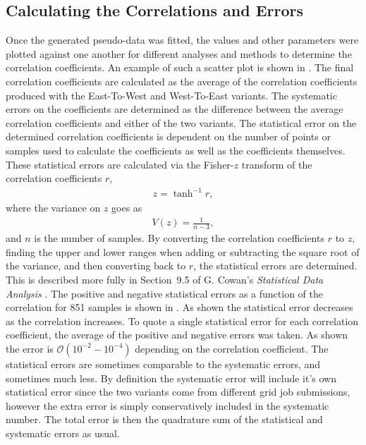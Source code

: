 \clearpage
\subsection{Calculating the Correlations and Errors}


Once the generated pseudo-data was fitted, the \R values and other parameters were plotted against one another for different analyses and methods to determine the correlation coefficients. An example of such a scatter plot is shown in . The final correlation coefficients are calculated as the average of the correlation coefficients produced with the East-To-West and West-To-East variants. The systematic errors on the coefficients are determined as the difference between the average correlation coefficients and either of the two variants. The statistical error on the determined correlation coefficients is dependent on the number of points or samples used to calculate the coefficients as well as the coefficients themselves. These statistical errors are calculated via the Fisher-$z$ transform of the correlation coefficients $r$,
\begin{align}
    z = \tanh^{-1}r,
\end{align}
where the variance on $z$ goes as
\begin{align}
    V(z) = \frac{1}{n-3},
\end{align}
and $n$ is the number of samples. By converting the correlation coefficients $r$ to $z$, finding the upper and lower ranges when adding or subtracting the square root of the variance, and then converting back to $r$, the statistical errors are determined. This is described more fully in Section~9.5 of G. Cowan's \textit{Statistical Data Analysis} \cite{Cowan}. The positive and negative statistical errors as a function of the correlation for 851 samples is shown in . As shown the statistical error decreases as the correlation increases. To quote a single statistical error for each correlation coefficient, the average of the positive and negative errors was taken. As shown the error is $\mathcal{O}(10^{-2} - 10^{-4})$ depending on the correlation coefficient. The statistical errors are sometimes comparable to the systematic errors, and sometimes much less. By definition the systematic error will include it's own statistical error since the two variants come from different grid job submissions, however the extra error is simply conservatively included in the systematic number. The total error is then the quadrature sum of the statistical and systematic errors as usual.




